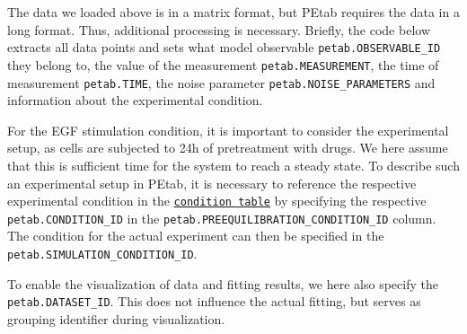 \documentclass[11pt]{article}
\begin{document}
The data we loaded above is in a matrix format, but PEtab requires the
data in a long format. Thus, additional processing is necessary.
Briefly, the code below extracts all data points and sets what model
observable \texttt{petab.OBSERVABLE\_ID} they belong to, the value of
the measurement \texttt{petab.MEASUREMENT}, the time of measurement
\texttt{petab.TIME}, the noise parameter
\texttt{petab.NOISE\_PARAMETERS} and information about the experimental
condition.

For the EGF stimulation condition, it is important to consider the
experimental setup, as cells are subjected to 24h of pretreatment with
drugs. We here assume that this is sufficient time for the system to
reach a steady state. To describe such an experimental setup in PEtab,
it is necessary to reference the respective experimental condition in
the
\href{https://petab.readthedocs.io/en/latest/documentation_data_format.html\#condition-table}{\texttt{condition\ table}}
by specifying the respective \texttt{petab.CONDITION\_ID} in the
\texttt{petab.PREEQUILIBRATION\_CONDITION\_ID} column. The condition for
the actual experiment can then be specified in the
\texttt{petab.SIMULATION\_CONDITION\_ID}.

To enable the visualization of data and fitting results, we here also
specify the \texttt{petab.DATASET\_ID}. This does not influence the
actual fitting, but serves as grouping identifier during visualization.
\end{document}
